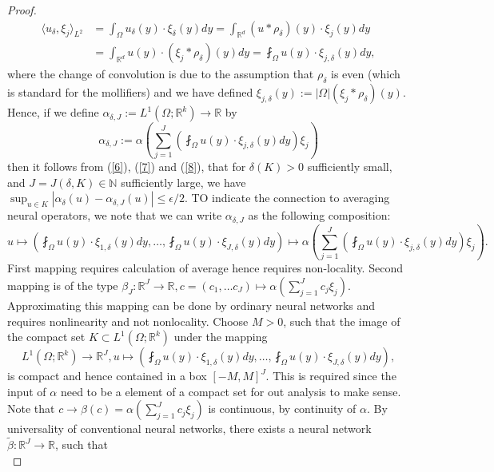 \documentclass[reqno]{amsart}
\theoremstyle{plain}
\theoremstyle{definition}
\newcommand{\bb}[1]{\mathbb{#1}}
\begin{document}
\begin{proof}
    \begin{equation} \label{8}
        \begin{aligned}
        \langle u_\delta,\xi_j\rangle_{L^2} &= \int_{\Omega}u_\delta (y) \cdot \xi_\delta (y) dy = \int_{\bb R^d} (u * \rho_\delta)(y) \cdot \xi_j(y) dy \\
        &= \int_{\bb R^d} u(y) \cdot (\xi_j * \rho_\delta)(y) dy = \fint_\Omega u(y) \cdot \xi_{j,\delta}(y) dy,
    \end{aligned}
    \end{equation}
    where the change of convolution is due to the assumption that $\rho_\delta$ is even (which is standard for the mollifiers) and we have defined $\xi_{j,\delta}(y) := |\Omega|(\xi_j * \rho_\delta)(y).$ Hence, if we define $\alpha_{\delta,J}:= L^1(\Omega;\bb R^k) \to \bb R$ by 
    $$ \alpha_{\delta,J} := \alpha\left(\sum_{j=1}^J\left(\fint_\Omega u(y)\cdot \xi_{j,\delta}(y) dy\right)\xi_j\right)$$
    then it follows from (\ref{6}), (\ref{7}) and (\ref{8}), that for $\delta(K) > 0$ sufficiently small, and $J = J(\delta,K) \in \bb N$ sufficiently large, we have $\sup_{u \in K}|\alpha_\delta(u) - \alpha_{\delta, J}(u)| \leq \epsilon/2$. TO indicate the connection to averaging neural operators, we note that we can write $\alpha_{\delta, J}$ as the following composition:
    {\small $$ u \mapsto \left(\fint_{\Omega} u(y) \cdot \xi_{1,\delta}(y)dy, \dots, \fint_{\Omega} u(y) \cdot \xi_{J,\delta}(y)dy \right) \mapsto \alpha\left(\sum_{j=1}^J\left(\fint_\Omega u(y)\cdot \xi_{j,\delta}(y) dy\right)\xi_j\right).$$ }
    First mapping requires calculation of average hence requires non-locality. Second mapping is of the type $\beta_J : \bb R^J \to \bb R, c = (c_1, \dots c_J) \mapsto \alpha(\sum_{j=1}^{J}c_j\xi_j).$ Approximating this mapping can be done by ordinary neural networks and requires nonlinearity and not nonlocality. Choose $M > 0$, such that the image of the compact set $K \subset L^1(\Omega;\bb R^k)$ under the mapping
    $$ L^1(\Omega; \bb R^k) \to \bb R^J, u \mapsto \left(\fint_\Omega u(y) \cdot \xi_{1,\delta}(y) dy, \dots, \fint_\Omega u(y) \cdot \xi_{J,\delta}(y) dy\right),$$
    is compact and hence contained in a box $[-M,M]^J$. This is required since the input of $\alpha$ need to be a element of a compact set for out analysis to make sense. Note that $c \to \beta(c) = \alpha\left(\sum_{j=1}^{J}c_j\xi_j\right)$ is continuous, by continuity of $\alpha$. By universality of conventional neural networks, there exists a neural network $\tilde{\beta}: \bb R^J \to \bb R$, such that
    \begin{equation}\label{eq8}

\end{equation}
\end{proof}
\end{document}

